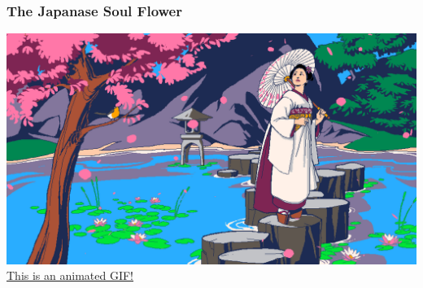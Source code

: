 \documentclass{beamer}
\begin{document}
\begin{frame}
  \frametitle{The Japanase Soul Flower}
  \includegraphics[width=.9\textwidth]{TheJapaneseSoulFlower_Final}\\
  \href{TheJapaneseSoulFlower_Final.gif}{This is an animated GIF!}
\end{frame}
\end{document}
